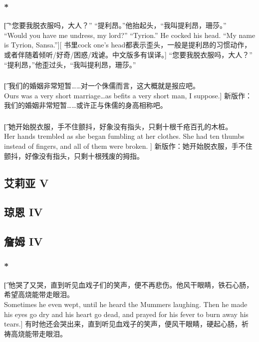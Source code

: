 \documentclass[12pt,a4paper]{article}
\begin{document}
\subsubsection{\color{red}*}\t[	
	“您要我脱衣服吗，大人？”
	“提利昂。”他抬起头，“我叫提利昂，珊莎。”\\
	“Would you have me undress, my lord?”
	“Tyrion.” He cocked his head. “My name is Tyrion, Sansa.”][
	书里cock one's head都表示歪头，一般是提利昂的习惯动作，或者伴随着倾听/好奇/困惑/戏谑。中文版多有误译。]
	“您要我脱衣服吗，大人？”
	“提利昂，”他歪过头，“我叫提利昂，珊莎。”
	
\subsubsection{}\t[
	我们的婚姻非常短暂……对一个侏儒而言，这大概就是报应吧。\\
	Ours was a very short marriage\ldots  as befits a very short man, I suppose.]
	新版作：我们的婚姻非常短暂……或许正与侏儒的身高相称吧。
	
\subsubsection{}\t[
	她开始脱衣服，手不住颤抖，好象没有指头，只剩十根千疮百孔的木桩。\\
	Her hands trembled as she began fumbling at her clothes. She had ten thumbs instead of fingers, and all of them were broken. ]
	新版作：她开始脱衣服，手不住颤抖，好像没有指头，只剩十根残废的拇指。

\subsection{艾莉亚 V}	

	
\subsection{琼恩 IV}

\subsection{詹姆 IV}
\subsubsection{\color{red}*}\t[
	他哭了又哭，直到听见血戏子们的笑声，便不再悲伤。他风干眼睛，铁石心肠，希望高烧能带走眼泪。\\
	Sometimes he even wept, until he heard the Mummers laughing. Then he made his eyes go dry and his heart go dead, and prayed for his fever to burn away his tears.]
	有时他还会哭出来，直到听见血戏子的笑声，便风干眼睛，硬起心肠，祈祷高烧能带走眼泪。
	
\end{document}
